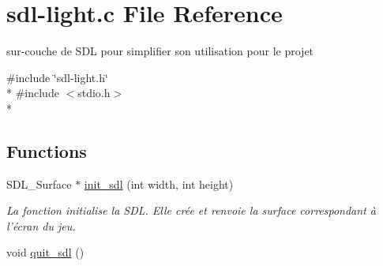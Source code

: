 \hypertarget{sdl-light_8c}{\section{sdl-\/light.c File Reference}
\label{sdl-light_8c}
}


sur-\/couche de S\-D\-L pour simplifier son utilisation pour le projet  


{\ttfamily \#include \char`\"{}sdl-\/light.\-h\char`\"{}}\\*
{\ttfamily \#include $<$stdio.\-h$>$}\\*
\subsection*{Functions}
\begin{DoxyCompactItemize}
\item 
S\-D\-L\-\_\-\-Surface $\ast$ \hyperlink{sdl-light_8c_a606ffc02c9374de366ba686f61fab06f}{init\-\_\-sdl} (int width, int height)
\begin{DoxyCompactList}\small\item\em La fonction initialise la S\-D\-L. Elle crée et renvoie la surface correspondant à l'écran du jeu. \end{DoxyCompactList}\item 
\hypertarget{sdl-light_8c_a3c815eb0d82fcbe817c8f5a6ff7dda41}{void \hyperlink{sdl-light_8c_a3c815eb0d82fcbe817c8f5a6ff7dda41}{quit\-\_\-sdl} ()}\label{sdl-light_8c_a3c815eb0d82fcbe817c8f5a6ff7dda41}


\end{DoxyCompactItemize}
